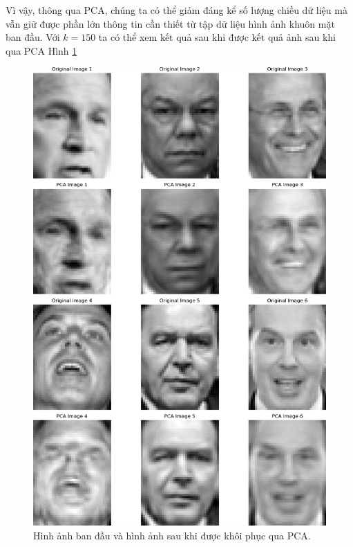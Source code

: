 \documentclass[12pt,a4paper,oneside]{report}
\numberwithin{equation}{section}
\begin{document}
Vì vậy, thông qua PCA, chúng ta có thể giảm đáng kể số lượng chiều dữ liệu mà vẫn giữ được phần lớn thông tin cần thiết từ tập dữ liệu hình ảnh khuôn mặt ban đầu. Với $k =150$ ta có thể xem kết quả sau khi được kết quả ảnh sau khi qua PCA Hình \ref{fig:eigenface}
\begin{figure}[htp]
	\centering
	\includegraphics[scale=0.62]{eigenface.png}
	\caption{Hình ảnh ban đầu và hình ảnh sau khi được khôi phục qua PCA.}
	\label{fig:eigenface}
\end{figure}
\end{document}
